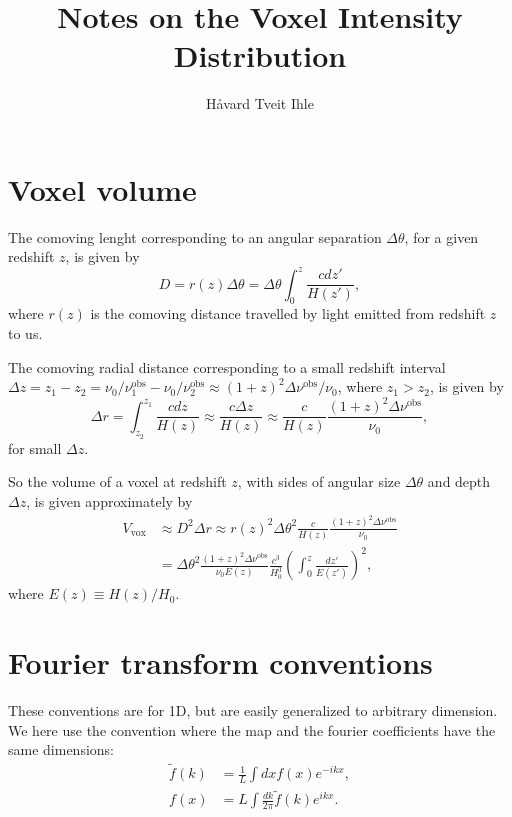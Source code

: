 \documentclass[a4paper,10pt]{article}
\title{Notes on the Voxel Intensity Distribution}
\author{Håvard Tveit Ihle}
\begin{document}
\maketitle

\section{Voxel volume}
The comoving lenght corresponding to an angular separation $\Delta \theta$, for a given redshift $z$, is given by
\begin{equation}
 D  = r(z) \Delta \theta   = \Delta \theta \int_0^z \frac{c dz'}{H(z')},
\end{equation}
where $r(z)$ is the comoving distance travelled by light emitted from redshift $z$ to us. 

The comoving radial distance corresponding to a small redshift interval $\Delta z = z_1- z_2 = \nu_0/\nu_1^\text{obs} - \nu_0/\nu_2^\text{obs} \approx (1+z)^2 \Delta \nu^\text{obs} /\nu_0$, where $z_1 > z_2$, is given by
\begin{equation}
 \Delta r = \int_{z_2}^{z_1} \frac{c dz}{H(z)} \approx \frac{c \Delta z}{H(z)} \approx \frac{c}{H(z)} \frac{(1+z)^2 \Delta \nu^\text{obs}}{\nu_0}, 
\end{equation}
for small $\Delta z$. 

So the volume of a voxel at redshift $z$, with sides of angular size $\Delta \theta$ and depth $\Delta z$, is given approximately by
\begin{align}
 V_\text{vox} &\approx D^2 \Delta r \approx  r(z)^2 \Delta \theta^2 \frac{c}{H(z)} \frac{(1+z)^2 \Delta \nu^\text{obs}}{\nu_0} \nonumber\\
 &= \Delta \theta^2 \frac{(1+z)^2 \Delta \nu^\text{obs} }{\nu_0 E(z)}\frac{c^3}{H_0^3}   \left(\int_0^z \frac{dz'}{E(z')}\right)^2,
\end{align}
where $E(z) \equiv H(z)/H_0.$

\section{Fourier transform conventions}
These conventions are for 1D, but are easily generalized to arbitrary dimension.
We here use the convention where the map and the fourier coefficients have the same dimensions: 
\begin{align}
 \tilde{f}(k) &= \frac{1}{L} \int dx f(x) e^{-ikx}, \\
 f(x) &= L \int \frac{dk}{2 \pi} \tilde{f}(k) e^{ikx}.
\end{align}
\end{document}
